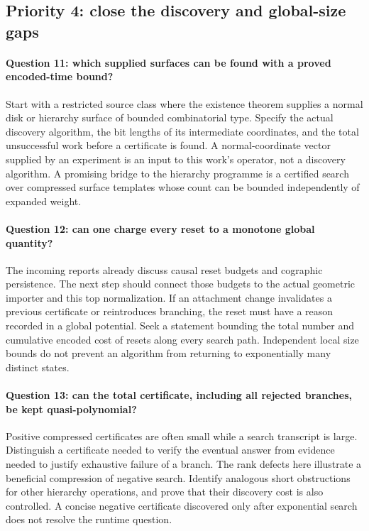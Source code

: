 \subsection{Priority 4: close the discovery and global-size gaps}
\paragraph{Question 11: which supplied surfaces can be found with a proved
encoded-time bound?}
Start with a restricted source class where the existence theorem supplies
a normal disk or hierarchy surface of bounded combinatorial type.  Specify
the actual discovery algorithm, the bit lengths of its intermediate
coordinates, and the total unsuccessful work before a certificate is
found.  A normal-coordinate vector supplied by an experiment is an input
to this work's operator, not a discovery algorithm.  A promising bridge
to the hierarchy programme is a certified search over compressed surface
templates whose count can be bounded independently of expanded weight.

\paragraph{Question 12: can one charge every reset to a monotone global
quantity?}
The incoming reports already discuss causal reset budgets and cographic
persistence.  The next step should connect those budgets to the actual
geometric importer and this top normalization.  If an attachment change
invalidates a previous certificate or reintroduces branching, the reset
must have a reason recorded in a global potential.  Seek a statement
bounding the total number and cumulative encoded cost of resets along
every search path.  Independent local size bounds do not prevent an
algorithm from returning to exponentially many distinct states.

\paragraph{Question 13: can the total certificate, including all rejected
branches, be kept quasi-polynomial?}
Positive compressed certificates are often small while a search transcript
is large.  Distinguish a certificate needed to verify the eventual answer
from evidence needed to justify exhaustive failure of a branch.  The
rank defects here illustrate a beneficial compression of negative search.
Identify analogous short obstructions for other hierarchy operations,
and prove that their discovery cost is also controlled.  A concise
negative certificate discovered only after exponential search does not
resolve the runtime question.

